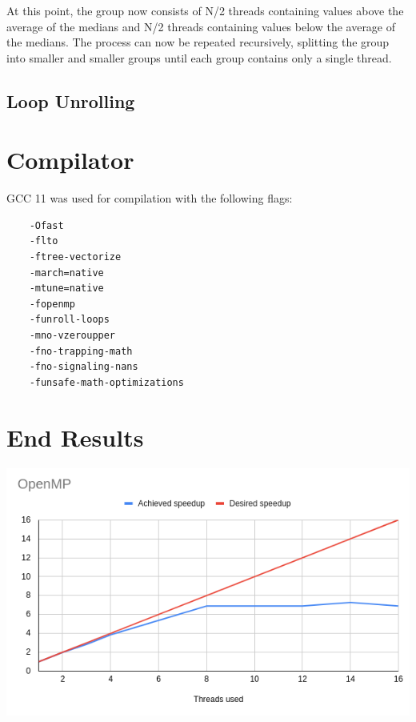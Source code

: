 \documentclass{report}
\begin{document}
At this point, the group now consists of N/2 threads containing values above the average of the medians and N/2 threads containing values below the average of the medians. 
The process can now be repeated recursively, splitting the group into smaller and smaller groups until each group contains only a single thread.




\subsection{Loop Unrolling}


\section{Compilator}
GCC 11 was used for compilation with the following flags:
\begin{lstlisting}
    -Ofast 
    -flto 
    -ftree-vectorize 
    -march=native 
    -mtune=native
    -fopenmp 
    -funroll-loops  
    -mno-vzeroupper 
    -fno-trapping-math 
    -fno-signaling-nans 
    -funsafe-math-optimizations
\end{lstlisting}

\section{End Results}




\includegraphics[width=\textwidth]{openmp.png}




\end{document}
